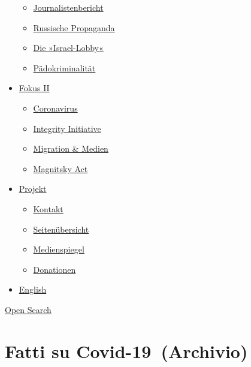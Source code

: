 \begin{itemize}
  \begin{itemize}
  \tightlist
  \item
    \href{https://swprs.org/bericht-eines-journalisten/}{Journalistenbericht}
  \item
    \href{https://swprs.org/russische-propaganda/}{Russische Propaganda}
  \item
    \href{https://swprs.org/die-israel-lobby-fakten-und-mythen/}{Die
    »Israel-Lobby«}
  \item
    \href{https://swprs.org/geopolitik-und-paedokriminalitaet/}{Pädokriminalität}
  \end{itemize}
\item
  \href{https://swprs.org/migration-und-medien/}{Fokus II}

  \begin{itemize}
  \tightlist
  \item
    \href{https://swprs.org/covid-19-hinweis-ii/}{Coronavirus}
  \item
    \href{https://swprs.org/die-integrity-initiative/}{Integrity
    Initiative}
  \item
    \href{https://swprs.org/migration-und-medien/}{Migration \& Medien}
  \item
    \href{https://swprs.org/der-fall-magnitsky/}{Magnitsky Act}
  \end{itemize}
\item
  \href{https://swprs.org/kontakt/}{Projekt}

  \begin{itemize}
  \tightlist
  \item
    \href{https://swprs.org/kontakt/}{Kontakt}
  \item
    \href{https://swprs.org/uebersicht/}{Seitenübersicht}
  \item
    \href{https://swprs.org/medienspiegel/}{Medienspiegel}
  \item
    \href{https://swprs.org/donationen/}{Donationen}
  \end{itemize}
\item
  \href{https://swprs.org/contact/}{English}
\end{itemize}

\protect\hyperlink{}{Open Search}

\hypertarget{fatti-su-covid-19-archivio}{%
\section{Fatti su
Covid-19~(Archivio)}\label{fatti-su-covid-19-archivio}}

